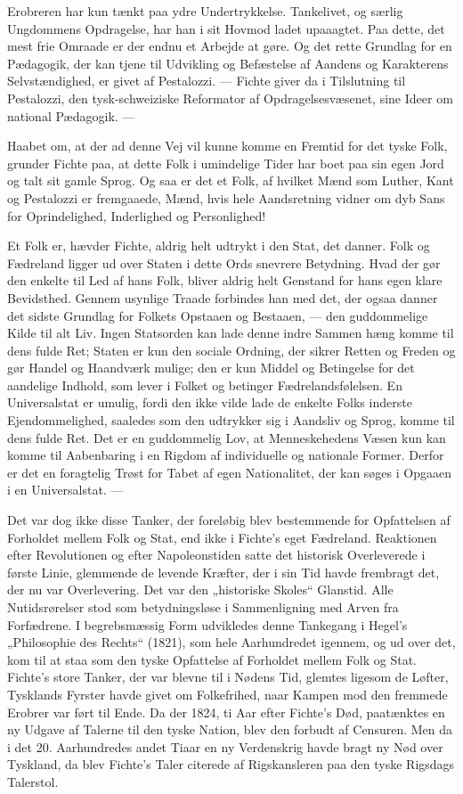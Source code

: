 \documentclass[12pt,a4paper,openany]{book}
\newcommand{\opage}[1]{\marginnote{\footnotesize\textit{[#1]}}}
\begin{document}
Erobreren har kun tænkt paa ydre Undertrykkelse. Tankelivet,
og særlig Ungdommens Opdragelse, har han i sit Hovmod ladet upaaagtet.
Paa dette, det mest frie Omraade er der endnu et Arbejde at
gøre. Og det rette Grundlag for en Pædagogik, der kan tjene til Udvikling
og Befæstelse af Aandens og Karakterens Selvstændighed, er
givet af Pestalozzi. --- Fichte giver da i Tilslutning til Pestalozzi,
den tysk-schweiziske Reformator af Opdragelsesvæsenet, sine Ideer
om national Pædagogik. ---

Haabet om, at der ad denne Vej vil kunne komme en Fremtid for
det tyske Folk, grunder Fichte paa, at dette Folk i umindelige Tider
har boet paa sin egen Jord og talt sit gamle Sprog. Og saa er det et
Folk, af hvilket Mænd som Luther, Kant og Pestalozzi er fremgaaede,
Mænd, hvis hele Aandsretning vidner om dyb Sans for Oprindelighed,
Inderlighed og Personlighed!

Et Folk er, hævder Fichte, aldrig helt udtrykt i den Stat, det
danner. Folk og Fædreland ligger ud over Staten i dette Ords snevrere
Betydning. Hvad der gør den enkelte til Led af hans Folk, bliver aldrig helt Genstand for hans egen klare Bevidsthed. Gennem
usynlige Traade forbindes han med det, der ogsaa danner det sidste
Grundlag 
for Folkets Opstaaen og Bestaaen, --- den guddommelige
Kilde til alt Liv. Ingen Statsorden kan lade denne indre Sammen%
\opage{105}hæng komme til dens fulde Ret; Staten er kun den sociale Ordning,
der sikrer Retten og Freden og gør Handel og Haandværk mulige;
den er kun Middel og Betingelse for det aandelige Indhold, som lever
i Folket og betinger Fædrelandsfølelsen. En Universalstat er umulig,
fordi den ikke vilde lade de enkelte Folks inderste Ejendommelighed,
saaledes som den udtrykker sig i Aandsliv og Sprog, komme til
dens fulde Ret. Det er en guddommelig Lov, at Menneskehedens Væsen
kun kan komme til Aabenbaring i en Rigdom af individuelle og
nationale Former. Derfor er det en foragtelig Trøst for Tabet af egen
Nationalitet, der kan søges i Opgaaen i en Universalstat. ---

Det var dog ikke disse Tanker, der foreløbig blev bestemmende
for Opfattelsen af Forholdet mellem Folk og Stat, end ikke i Fichte’s
eget Fædreland. Reaktionen efter Revolutionen og efter Napoleonstiden
satte det historisk Overleverede i første Linie, glemmende de
levende Kræfter, der i sin Tid havde frembragt det, der nu var Overlevering.
Det var den „historiske Skoles“ Glanstid. Alle Nutidsrørelser
stod som betydningsløse i Sammenligning med Arven fra Forfædrene.
I begrebsmæssig Form udvikledes denne Tankegang i Hegel’s
„Philosophie des Rechts“ (1821), som hele Aarhundredet igennem,
og ud over det, kom til at staa som den tyske Opfattelse af
Forholdet mellem Folk og Stat. Fichte’s store Tanker, der var blevne
til i Nødens Tid, glemtes ligesom de Løfter, Tysklands Fyrster havde
givet om Folkefrihed, naar Kampen mod den fremmede Erobrer var
ført til Ende. Da der 1824, ti Aar efter Fichte’s Død, paatænktes en
ny Udgave af Talerne til den tyske Nation, blev den forbudt af Censuren.
Men da i det 20. Aarhundredes andet Tiaar en ny Verdenskrig
havde bragt ny Nød over Tyskland, da blev Fichte’s Taler citerede
af Rigskansleren paa den tyske Rigsdags Talerstol.
\end{document}
